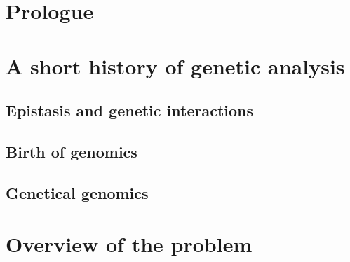 \section*{Prologue}

\section*{A short history of genetic analysis}
\subsection*{Epistasis and genetic interactions}

\subsection*{Birth of genomics}

\subsection*{Genetical genomics}

\section*{Overview of the problem}
